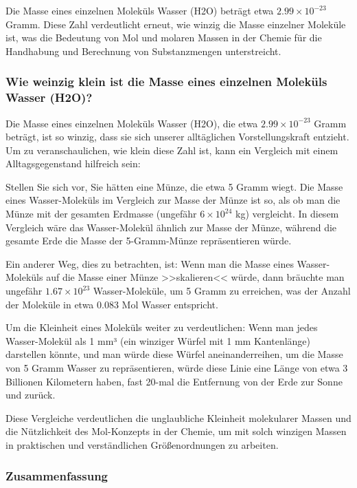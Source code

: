 \documentclass{vorlage-design-main}
\begin{document}
Die Masse eines einzelnen Moleküls Wasser (H2O) beträgt etwa
$2.99 \times 10^{-23}$ Gramm. Diese Zahl verdeutlicht erneut, wie
winzig die Masse einzelner Moleküle ist, was die Bedeutung von Mol und
molaren Massen in der Chemie für die Handhabung und Berechnung von
Substanzmengen unterstreicht.

\hypertarget{wie-weinzig-klein-ist-die-masse-eines-einzelnen-molekuxfcls-wasser-h2o}{%
\subsubsection{Wie weinzig klein ist die Masse eines einzelnen Moleküls
Wasser
(H2O)?}\label{wie-weinzig-klein-ist-die-masse-eines-einzelnen-molekuels-wasser-h2o}}

Die Masse eines einzelnen Moleküls Wasser (H2O), die etwa
$2.99 \times 10^{-23}$ Gramm beträgt, ist so winzig, dass sie sich
unserer alltäglichen Vorstellungskraft entzieht. Um zu veranschaulichen,
wie klein diese Zahl ist, kann ein Vergleich mit einem Alltagsgegenstand
hilfreich sein:

Stellen Sie sich vor, Sie hätten eine Münze, die etwa 5 Gramm wiegt. Die
Masse eines Wasser-Moleküls im Vergleich zur Masse der Münze ist so, als
ob man die Münze mit der gesamten Erdmasse (ungefähr
$6 \times 10^{24}$ kg) vergleicht. In diesem Vergleich wäre das
Wasser-Molekül ähnlich zur Masse der Münze, während die gesamte Erde die
Masse der 5-Gramm-Münze repräsentieren würde.

Ein anderer Weg, dies zu betrachten, ist: Wenn man die Masse eines
Wasser-Moleküls auf die Masse einer Münze >>skalieren<< würde, dann
bräuchte man ungefähr $1.67 \times 10^{23}$ Wasser-Moleküle, um 5
Gramm zu erreichen, was der Anzahl der Moleküle in etwa 0.083 Mol Wasser
entspricht.

Um die Kleinheit eines Moleküls weiter zu verdeutlichen: Wenn man jedes
Wasser-Molekül als 1 mm³ (ein winziger Würfel mit 1 mm Kantenlänge)
darstellen könnte, und man würde diese Würfel aneinanderreihen, um die
Masse von 5 Gramm Wasser zu repräsentieren, würde diese Linie eine Länge
von etwa 3 Billionen Kilometern haben, fast 20-mal die Entfernung von
der Erde zur Sonne und zurück.

Diese Vergleiche verdeutlichen die unglaubliche Kleinheit molekularer
Massen und die Nützlichkeit des Mol-Konzepts in der Chemie, um mit solch
winzigen Massen in praktischen und verständlichen Größenordnungen zu
arbeiten.

\hypertarget{zusammenfassung}{%
\subsubsection{Zusammenfassung}\label{zusammenfassung}}
\end{document}
